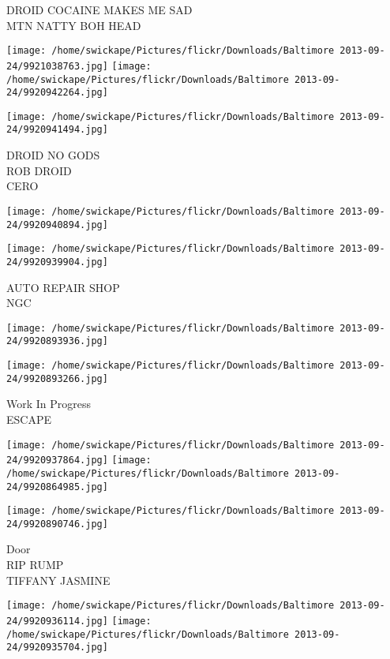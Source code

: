 \documentclass[10pt,letterpaper]{article}
\begin{document}
DROID COCAINE MAKES ME SAD\\
MTN NATTY BOH HEAD
\pagebreak

\texttt{[image: /home/swickape/Pictures/flickr/Downloads/Baltimore 2013-09-24/9921038763.jpg]}
\texttt{[image: /home/swickape/Pictures/flickr/Downloads/Baltimore 2013-09-24/9920942264.jpg]}

\vspace{0.25in}
\texttt{[image: /home/swickape/Pictures/flickr/Downloads/Baltimore 2013-09-24/9920941494.jpg]}

DROID NO GODS\\
ROB DROID\\
CERO
\pagebreak

\texttt{[image: /home/swickape/Pictures/flickr/Downloads/Baltimore 2013-09-24/9920940894.jpg]}

\vspace{0.25in}
\texttt{[image: /home/swickape/Pictures/flickr/Downloads/Baltimore 2013-09-24/9920939904.jpg]}

AUTO REPAIR SHOP\\
NGC
\pagebreak

\texttt{[image: /home/swickape/Pictures/flickr/Downloads/Baltimore 2013-09-24/9920893936.jpg]}

\vspace{0.25in}
\texttt{[image: /home/swickape/Pictures/flickr/Downloads/Baltimore 2013-09-24/9920893266.jpg]}

Work In Progress\\
ESCAPE
\pagebreak

\texttt{[image: /home/swickape/Pictures/flickr/Downloads/Baltimore 2013-09-24/9920937864.jpg]}
\texttt{[image: /home/swickape/Pictures/flickr/Downloads/Baltimore 2013-09-24/9920864985.jpg]}

\vspace{0.25in}
\texttt{[image: /home/swickape/Pictures/flickr/Downloads/Baltimore 2013-09-24/9920890746.jpg]}

Door\\
RIP RUMP\\
TIFFANY JASMINE
\pagebreak

\texttt{[image: /home/swickape/Pictures/flickr/Downloads/Baltimore 2013-09-24/9920936114.jpg]}
\texttt{[image: /home/swickape/Pictures/flickr/Downloads/Baltimore 2013-09-24/9920935704.jpg]}
\end{document}
